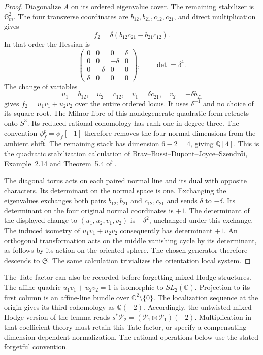 \begin{proof}
Diagonalize $A$ on its ordered eigenvalue cover. The remaining
stabilizer is $\mathbb G_m^2$. The four transverse coordinates are
$b_{12},b_{21},c_{12},c_{21}$, and direct multiplication gives
\begin{equation}
 f_2=\delta(b_{12}c_{21}-b_{21}c_{12}).
 \label{eq:c3-separated-quadratic}
\end{equation}
In that order the Hessian is
\[
 \begin{pmatrix}
 0&0&0&\delta\\
 0&0&-\delta&0\\
 0&-\delta&0&0\\
 \delta&0&0&0
 \end{pmatrix},\qquad \det=\delta^4.
\]
The change of variables
\[
 u_1=b_{12},\quad u_2=c_{12},\quad
 v_1=\delta c_{21},\quad v_2=-\delta b_{21}
\]
gives $f_2=u_1v_1+u_2v_2$ over the entire ordered locus.
It uses $\delta^{-1}$ and no choice of its square root.
The Milnor fibre of this nondegenerate quadratic form retracts
onto $S^3$. Its reduced rational cohomology has rank one in degree
three. The convention $\phi_f^p=\phi_f[-1]$ therefore removes the four
normal dimensions from the ambient shift. The remaining stack has
dimension $6-2=4$, giving $\mathbb Q[4]$.
This is the quadratic stabilization calculation of
Brav--Bussi--Dupont--Joyce--Szendr\H{o}i,
Example~2.14 and Theorem~5.4 of \cite{BBDJSVanishing}.

The diagonal torus acts on each paired normal line and its dual
with opposite characters. Its determinant on the normal space is
one. Exchanging the eigenvalues exchanges both pairs
$b_{12},b_{21}$ and $c_{12},c_{21}$ and sends $\delta$ to $-\delta$.
Its determinant on the four original normal coordinates is $+1$.
The determinant of the displayed change to $(u_1,u_2,v_1,v_2)$ is
$-\delta^2$, unchanged under this exchange. The induced isometry
of $u_1v_1+u_2v_2$ consequently has determinant $+1$.
An orthogonal transformation acts on the middle vanishing cycle
by its determinant, as follows by its action on the oriented sphere.
The chosen generator therefore descends to $\mathfrak S$.
The same calculation trivializes the orientation local system.
\end{proof}

The Tate factor can also be recorded before forgetting mixed Hodge
structures. The affine quadric $u_1v_1+u_2v_2=1$ is isomorphic to
$SL_2(\mathbb C)$. Projection to its first column is an affine-line
bundle over $\mathbb C^2\setminus\{0\}$. The localization sequence
at the origin gives its third cohomology as $\mathbb Q(-2)$.
Accordingly, the untwisted mixed-Hodge version of the lemma reads
$s^*\mathcal P_2=(\mathcal P_1\boxtimes\mathcal P_1)(-2)$.
Multiplication in that coefficient theory must retain this Tate
factor, or specify a compensating dimension-dependent normalization.
The rational operations below use the stated forgetful convention.

